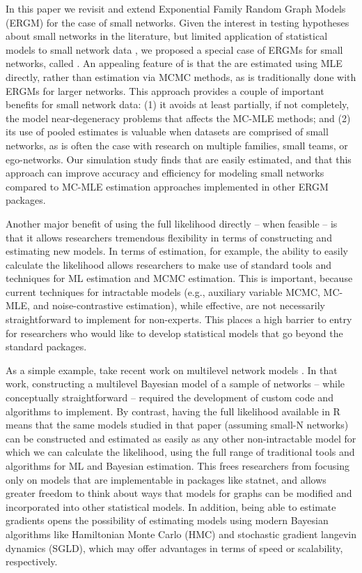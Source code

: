 \documentclass[review]{elsarticle}
\begin{document}
In this paper we revisit and extend Exponential Family Random Graph Models (ERGM) for the case of small networks. Given the interest in testing hypotheses about small networks in the literature, but limited application of statistical models to small network data \cite[][and others]{Robins2007,Holland1981,Frank1986,Wasserman1996,Snijders2006}, we proposed a special case of ERGMs for small networks, called \ergmitos{}. An appealing feature of \ergmitos{} is that the are estimated using MLE directly, rather than estimation via MCMC methods, as is traditionally done with ERGMs for larger networks. This approach provides a couple of important benefits for small network data: (1) it avoids at least partially, if not completely, the model near-degeneracy problems that affects the MC-MLE methods; and (2) its use of pooled estimates is valuable when datasets are comprised of small networks, as is often the case with research on multiple families, small teams, or ego-networks. Our simulation study finds that \ergmitos{} are easily estimated, and that this approach can improve accuracy and efficiency for modeling small networks compared to MC-MLE estimation approaches implemented in other ERGM packages.

Another major benefit of using the full likelihood directly -- when feasible -- is that it allows researchers tremendous flexibility in terms of constructing and estimating new models. In terms of estimation, for example, the ability to easily calculate the likelihood allows researchers to make use of standard tools and techniques for ML estimation and MCMC estimation. This is important, because current techniques for intractable models (e.g., auxiliary variable MCMC, MC-MLE, and noise-contrastive estimation), while effective, are not necessarily straightforward to implement for non-experts. This places a high barrier to entry for researchers who would like to develop statistical models that go beyond the standard packages. 

As a simple example, take recent work on multilevel network models \cite{slaughter2016multilevel}. In that work, constructing a multilevel Bayesian model of a sample of networks -- while conceptually straightforward -- required the development of custom code and algorithms to implement. By contrast, having the full likelihood available in R means that the same models studied in that paper (assuming small-N networks) can be constructed and estimated as easily as any other non-intractable model for which we can calculate the likelihood, using the full range of traditional tools and algorithms for ML and Bayesian estimation. This frees researchers from focusing only on models that are implementable in packages like statnet, and allows greater freedom to think about ways that models for graphs can be modified and incorporated into other statistical models. In addition, being able to estimate gradients opens the possibility of estimating models using modern Bayesian algorithms like Hamiltonian Monte Carlo (HMC) and stochastic gradient langevin dynamics (SGLD), which may offer advantages in terms of speed or scalability, respectively.
\end{document}
